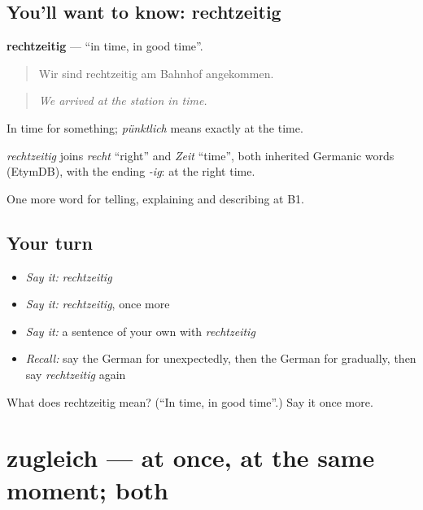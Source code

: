 \subsection*{You'll want to know: rechtzeitig}
\textbf{rechtzeitig} — \textquotedblleft{}in time, in good time\textquotedblright{}.

\begin{quote}
Wir sind rechtzeitig am Bahnhof angekommen.
\end{quote}

\begin{quote}
\emph{We arrived at the station in time.}
\end{quote}

In time for something; \emph{pünktlich} means exactly at the time.

\begin{cousinweb}
\emph{rechtzeitig} joins \emph{recht} \textquotedblleft{}right\textquotedblright{} and \emph{Zeit} \textquotedblleft{}time\textquotedblright{}, both inherited Germanic words (EtymDB), with the ending \emph{-ig}: at the right time.
\end{cousinweb}

\begin{grammarlens}[title={What you've built}]
One more word for telling, explaining and describing at B1.
\end{grammarlens}

\subsection*{Your turn}
\begin{itemize}
\raggedright
  \item \emph{Say it:} \emph{rechtzeitig}
  \item \emph{Say it:} \emph{rechtzeitig}, once more
  \item \emph{Say it:} a sentence of your own with \emph{rechtzeitig}
  \item \emph{Recall:} say the German for unexpectedly, then the German for gradually, then say \emph{rechtzeitig} again
\end{itemize}

\begin{tcolorbox}[breakable,colback=teal!4,colframe=teal!35!black,title={Before you move on}]
What does rechtzeitig mean? (\textquotedblleft{}In time, in good time\textquotedblright{}.) Say it once more.
\end{tcolorbox}
\section[zugleich]{zugleich — at once, at the same moment; both}

